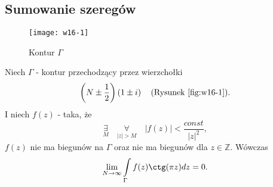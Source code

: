 \documentclass[../main.tex]{subfiles}
\begin{document}
    \subsection{Sumowanie szeregów}
    \begin{figure}[h]
        \centering
        \texttt{[image: w16-1]}
        \caption{Kontur $\Gamma$}
        \label{fig:w16-1}
    \end{figure}
    \begin{stw}
        Niech $\Gamma$ - kontur przechodzący przez wierzchołki
        \[
            \left(N \pm \frac{1}{2}\right)\left(1 \pm i\right)\quad (\text{Rysunek }\ref{fig:w16-1})
        .\]
    I niech $f(z)$ - taka, że
        \[
            \underset{M}{\exists} \quad \underset{|z| > M}{\forall} \quad \left| f(z) \right| < \frac{const}{\left| z \right| ^2}
        ,\]
    $f(z)$ nie ma biegunów na $\Gamma$ oraz nie ma biegunów dla $z\in \mathbb{Z}$.
        Wówczas
        \[
            \lim\limits_{N\to\infty}\int\limits_{\Gamma}f(z) \ctg(\pi z)dz = 0
        .\]
    \end{stw}
\end{document}
